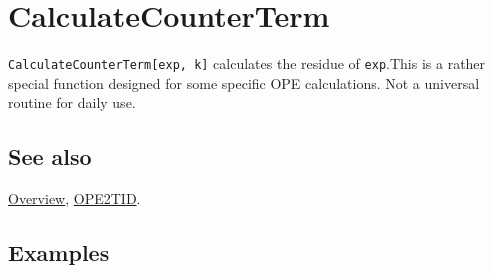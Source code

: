 \documentclass[../FeynCalcManual.tex]{subfiles}
\begin{document}
\hypertarget{calculatecounterterm}{%
\section{CalculateCounterTerm}\label{calculatecounterterm}}

\texttt{CalculateCounterTerm[\allowbreak{}exp,\ \allowbreak{}k]}
calculates the residue of \texttt{exp}.This is a rather special function
designed for some specific OPE calculations. Not a universal routine for
daily use.

\subsection{See also}

\hyperlink{toc}{Overview}, \hyperlink{ope2tid}{OPE2TID}.

\subsection{Examples}
\end{document}
